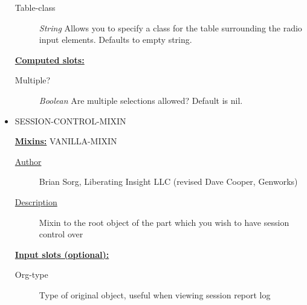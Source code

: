 \documentclass [11pt]{book}
\begin{document}
\begin{itemize}
\begin{description}
\item [Table-class]
\emph{String} Allows you to specify a class for the table surrounding the radio input elements. Defaults to empty string.


\end{description}






\textbf{
\underline{Computed slots:}}

\begin{description}

\item [Multiple?]
\emph{Boolean} Are multiple selections allowed? Default is nil.


\end{description}







\item {}SESSION-CONTROL-MIXIN


\textbf{
\underline{Mixins:}} VANILLA-MIXIN





\begin{description}

\item [
\underline{Author}]


Brian Sorg, Liberating Insight LLC (revised Dave Cooper, Genworks)



\item [
\underline{Description}]


Mixin to the root object of the part which you wish to have session control over



\end{description}








\textbf{
\underline{Input slots (optional):}}

\begin{description}

\item [Org-type]
Type of original object, useful when viewing session report log



\end{description}
\end{itemize}
\end{document}
